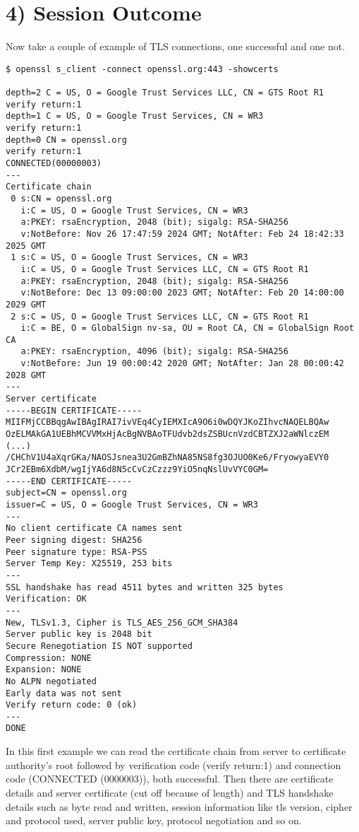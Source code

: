 \documentclass{article}
\begin{document}
\section*{4) Session Outcome}
Now take a couple of example of TLS connections, one successful and one not.\\

\begin{verbatim}
$ openssl s_client -connect openssl.org:443 -showcerts

depth=2 C = US, O = Google Trust Services LLC, CN = GTS Root R1
verify return:1
depth=1 C = US, O = Google Trust Services, CN = WR3
verify return:1
depth=0 CN = openssl.org
verify return:1
CONNECTED(00000003)
---
Certificate chain
 0 s:CN = openssl.org
   i:C = US, O = Google Trust Services, CN = WR3
   a:PKEY: rsaEncryption, 2048 (bit); sigalg: RSA-SHA256
   v:NotBefore: Nov 26 17:47:59 2024 GMT; NotAfter: Feb 24 18:42:33 2025 GMT
 1 s:C = US, O = Google Trust Services, CN = WR3
   i:C = US, O = Google Trust Services LLC, CN = GTS Root R1
   a:PKEY: rsaEncryption, 2048 (bit); sigalg: RSA-SHA256
   v:NotBefore: Dec 13 09:00:00 2023 GMT; NotAfter: Feb 20 14:00:00 2029 GMT
 2 s:C = US, O = Google Trust Services LLC, CN = GTS Root R1
   i:C = BE, O = GlobalSign nv-sa, OU = Root CA, CN = GlobalSign Root CA
   a:PKEY: rsaEncryption, 4096 (bit); sigalg: RSA-SHA256
   v:NotBefore: Jun 19 00:00:42 2020 GMT; NotAfter: Jan 28 00:00:42 2028 GMT
---
Server certificate
-----BEGIN CERTIFICATE-----
MIIFMjCCBBqgAwIBAgIRAI7ivVEq4CyIEMXIcA9O6i0wDQYJKoZIhvcNAQELBQAw
OzELMAkGA1UEBhMCVVMxHjAcBgNVBAoTFUdvb2dsZSBUcnVzdCBTZXJ2aWNlczEM
(...)
/CHChV1U4aXqrGKa/NAOSJsnea3U2GmBZhNA85NS8fg3OJUO0Ke6/FryowyaEVY0
JCr2EBm6XdbM/wgIjYA6d8N5cCvCzCzzz9YiO5nqNslUvVYC0GM=
-----END CERTIFICATE-----
subject=CN = openssl.org
issuer=C = US, O = Google Trust Services, CN = WR3
---
No client certificate CA names sent
Peer signing digest: SHA256
Peer signature type: RSA-PSS
Server Temp Key: X25519, 253 bits
---
SSL handshake has read 4511 bytes and written 325 bytes
Verification: OK
---
New, TLSv1.3, Cipher is TLS_AES_256_GCM_SHA384
Server public key is 2048 bit
Secure Renegotiation IS NOT supported
Compression: NONE
Expansion: NONE
No ALPN negotiated
Early data was not sent
Verify return code: 0 (ok)
---
DONE
\end{verbatim}

In this first example we can read the certificate chain from server to certificate authority's root followed by verification code (verify return:1) and connection code (CONNECTED (0000003)), both successful. Then there are certificate details and server certificate (cut off because of length) and TLS handshake details such as byte read and written, session information like tls version, cipher and protocol used, server public key, protocol negotiation and so on.\\
\end{document}
